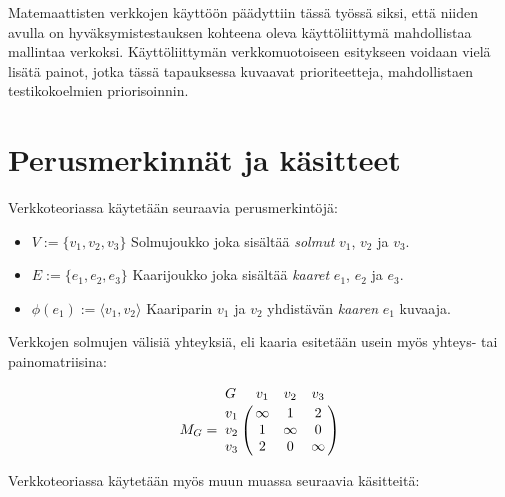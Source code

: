   Matemaattisten verkkojen käyttöön päädyttiin tässä työssä siksi, että niiden avulla on hyväksymistestauksen kohteena oleva käyttöliittymä mahdollistaa mallintaa verkoksi.
  Käyttöliittymän verkkomuotoiseen esitykseen voidaan vielä lisätä painot, jotka tässä tapauksessa kuvaavat prioriteetteja, mahdollistaen testikokoelmien priorisoinnin.

\section{Perusmerkinnät ja käsitteet} \label{ch:09_perusmerkinnat_ja_kasitteet}

  Verkkoteoriassa käytetään seuraavia perusmerkintöjä:

  \begin{itemize}
    \item \(V := \{v_1, v_2, v_3\}\) Solmujoukko joka sisältää \emph{solmut} \(v_1\), \(v_2\) ja \(v_3\).
    \item \(E := \{e_1, e_2, e_3\}\) Kaarijoukko joka sisältää \emph{kaaret} \(e_1\), \(e_2\) ja \(e_3\).
    \item \(\phi(e_1) := \langle v_1, v_2 \rangle\) Kaariparin \(v_1\) ja \(v_2\) yhdistävän \emph{kaaren} \(e_1\) kuvaaja.
  \end{itemize}

  Verkkojen solmujen välisiä yhteyksiä, eli kaaria esitetään usein myös yhteys- tai painomatriisina:

  \[
    M_G =
    \bordermatrix{
      G & v_1 & v_2 & v_3 \cr
      v_1 & \infty & 1 & 2 \cr
      v_2 & 1 & \infty & 0 \cr
      v_3 & 2 & 0 & \infty \cr
    }
  \]

  Verkkoteoriassa käytetään myös muun muassa seuraavia käsitteitä:

